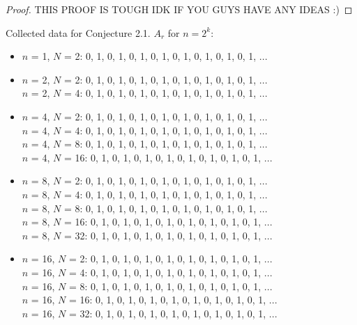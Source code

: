 \documentclass{article}
\begin{document}
\begin{flushleft}
\begin{proof}
        \vspace{.1in}
        
        THIS PROOF IS TOUGH IDK IF YOU GUYS HAVE ANY IDEAS :)

    \end{proof}

    \vspace{.1in}
    
    Collected data for Conjecture 2.1. $A_r$ for $n=2^k$:
    \begin{itemize}
        \item $n$ = 1, $N$ = 2:  0, 1, 0, 1, 0, 1, 0, 1, 0, 1, 0, 1, 0, 1, 0, 1, ...
        \item $n$ = 2, $N$ = 2:  0, 1, 0, 1, 0, 1, 0, 1, 0, 1, 0, 1, 0, 1, 0, 1, ...
            \\ $n$ = 2, $N$ = 4:  0, 1, 0, 1, 0, 1, 0, 1, 0, 1, 0, 1, 0, 1, 0, 1, ...
        \item $n$ = 4, $N$ = 2:  0, 1, 0, 1, 0, 1, 0, 1, 0, 1, 0, 1, 0, 1, 0, 1, ...
            \\ $n$ = 4, $N$ = 4:  0, 1, 0, 1, 0, 1, 0, 1, 0, 1, 0, 1, 0, 1, 0, 1, ...
            \\ $n$ = 4, $N$ = 8:  0, 1, 0, 1, 0, 1, 0, 1, 0, 1, 0, 1, 0, 1, 0, 1, ...
            \\ $n$ = 4, $N$ = 16:  0, 1, 0, 1, 0, 1, 0, 1, 0, 1, 0, 1, 0, 1, 0, 1, ...
        \item $n$ = 8, $N$ = 2:  0, 1, 0, 1, 0, 1, 0, 1, 0, 1, 0, 1, 0, 1, 0, 1, ...
            \\ $n$ = 8, $N$ = 4:  0, 1, 0, 1, 0, 1, 0, 1, 0, 1, 0, 1, 0, 1, 0, 1, ...
            \\ $n$ = 8, $N$ = 8:  0, 1, 0, 1, 0, 1, 0, 1, 0, 1, 0, 1, 0, 1, 0, 1, ...
            \\ $n$ = 8, $N$ = 16:  0, 1, 0, 1, 0, 1, 0, 1, 0, 1, 0, 1, 0, 1, 0, 1, ...
            \\ $n$ = 8, $N$ = 32:  0, 1, 0, 1, 0, 1, 0, 1, 0, 1, 0, 1, 0, 1, 0, 1, ...
        \item $n$ = 16, $N$ = 2:  0, 1, 0, 1, 0, 1, 0, 1, 0, 1, 0, 1, 0, 1, 0, 1, ...
            \\ $n$ = 16, $N$ = 4:  0, 1, 0, 1, 0, 1, 0, 1, 0, 1, 0, 1, 0, 1, 0, 1, ...
            \\ $n$ = 16, $N$ = 8:  0, 1, 0, 1, 0, 1, 0, 1, 0, 1, 0, 1, 0, 1, 0, 1, ...
            \\ $n$ = 16, $N$ = 16:  0, 1, 0, 1, 0, 1, 0, 1, 0, 1, 0, 1, 0, 1, 0, 1, ...
            \\ $n$ = 16, $N$ = 32:  0, 1, 0, 1, 0, 1, 0, 1, 0, 1, 0, 1, 0, 1, 0, 1, ...

\end{itemize}
\end{flushleft}
\end{document}
